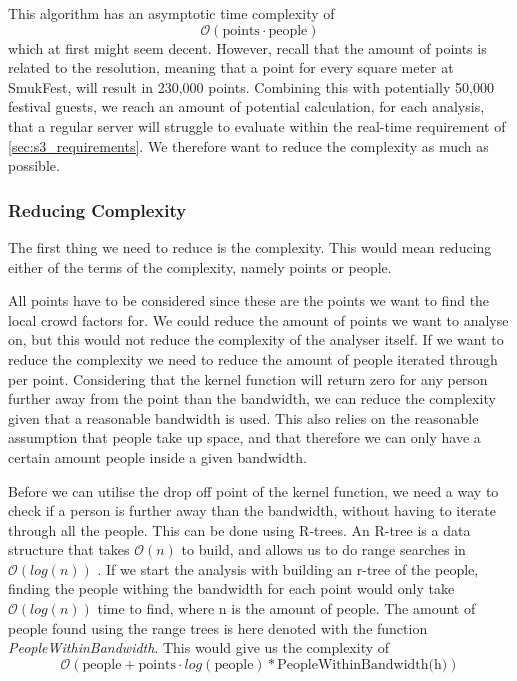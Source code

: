 This algorithm has an asymptotic time complexity of $$\mathcal{O}(\text{points} \cdot \text{people})$$ which at first might seem decent. However, recall that the amount of points is related to the resolution, meaning that a point for every square meter at SmukFest, will result in 230,000 points\cite{smukFacts}. Combining this with potentially 50,000 festival guests\cite{smukFacts}, we reach an amount of potential calculation, for each analysis, that a regular server will struggle to evaluate within the real-time requirement of \cref{sec:s3_requirements}. We therefore want to reduce the complexity as much as possible.


\subsubsection{Reducing Complexity}

The first thing we need to reduce is the complexity. This would mean reducing either of the terms of the complexity, namely points or people.

All points have to be considered since these are the points we want to find the local crowd factors for. We could reduce the amount of points we want to analyse on, but this would not reduce the complexity of the analyser itself. If we want to reduce the complexity we need to reduce the amount of people iterated through per point. Considering that the kernel function will return zero for any person further away from the point than the bandwidth, we can reduce the complexity given that a reasonable bandwidth is used. This also relies on the reasonable assumption that people take up space, and that therefore we can only have a certain amount people inside a given bandwidth.

Before we can utilise the drop off point of the kernel function, we need a way to check if a person is further away than the bandwidth, without having to iterate through all the people. This can be done using R-trees. An R-tree is a data structure that takes $\mathcal{O}(n)$ to build, and allows us to do range searches in $\mathcal{O}(log(n))$ \cite{rtree}. If we start the analysis with building an r-tree of the people, finding the people withing the bandwidth for each point would only take $\mathcal{O}(log(n))$ time to find, where n is the amount of people. The amount of people found using the range trees is here denoted with the function \emph{PeopleWithinBandwidth}. This would give us the complexity of $$\mathcal{O}(\text{people} + \text{points} \cdot log(\text{people}) * \text{PeopleWithinBandwidth(h)})$$

